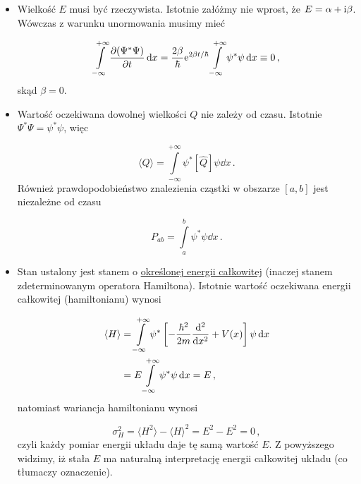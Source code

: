 \documentclass{myclass}
\begin{document}
\begin{itemize}

    \item Wielkość \(E\) musi być rzeczywista. Istotnie załóżmy nie wprost, że
    \(E=\alpha+\mathrm{i}\beta\). Wówczas z warunku unormowania musimy mieć

    \begin{equation*}
        \int\limits_{-\infty}^{+\infty}\pdv{(\Psi^*\Psi)}{t}\dd{x}=\frac{2\beta}{\hbar}\mathrm{e}^{2\beta t/\hbar}\int\limits_{-\infty}^{+\infty}\psi^*\psi\dd{x}\equiv 0\,,
    \end{equation*}
    skąd \(\beta=0\).

    \item Wartość oczekiwana dowolnej wielkości \(Q\) nie zależy od czasu. Istotnie
    \(\Psi^*\Psi=\psi^*\psi\), więc

    \begin{equation*}
        \langle Q\rangle=\int\limits_{-\infty}^{+\infty}\psi^*[\hat{Q}]\psi\dd{x}\,.
    \end{equation*}
    Również prawdopodobieństwo znalezienia cząstki w obszarze \([a,b]\) jest niezależne od czasu

    \begin{equation*}
        P_{ab}=\int\limits_{a}^{b}\psi^*\psi\dd{x}\,.
    \end{equation*}
    
    \item Stan ustalony jest stanem o \underline{określonej energii całkowitej} (inaczej stanem
    zdeterminowanym operatora Hamiltona). Istotnie wartość oczekiwana energii całkowitej
    (hamiltonianu) wynosi

    \begin{equation*}
    \begin{split}
        \langle H \rangle&=\int\limits_{-\infty}^{+\infty}\psi^*\left[-\frac{\hbar^2}{2m}\dv[2]{}{x}+V(x)\right]\psi\dd{x}\\
        &=E\int\limits_{-\infty}^{+\infty}\psi^*\psi\dd{x}=E\,,
    \end{split}
    \end{equation*}
    natomiast wariancja hamiltonianu wynosi

    \begin{equation*}
        \sigma_H^2=\langle H^2\rangle-\langle H\rangle^2=E^2-E^2=0\,,
    \end{equation*}
    czyli każdy pomiar energii układu daje tę samą wartość \(E\). Z powyższego widzimy, iż stała
    \(E\) ma naturalną interpretację energii całkowitej układu (co tłumaczy oznaczenie).
    

\end{itemize}
\end{document}
